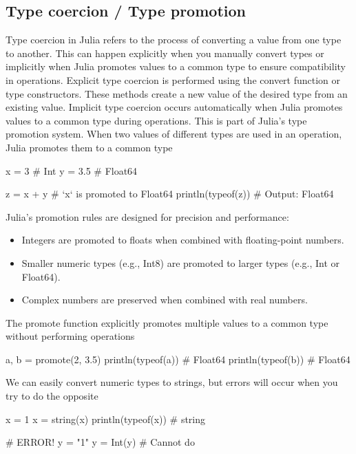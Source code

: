 \documentclass{report}
\begin{document}
    \subsection{Type coercion / Type promotion}
    \bigbreak \noindent 
    Type coercion in Julia refers to the process of converting a value from one type to another. This can happen explicitly when you manually convert types or implicitly when Julia promotes values to a common type to ensure compatibility in operations.
    \bigbreak \noindent 
    Explicit type coercion is performed using the convert function or type constructors. These methods create a new value of the desired type from an existing value.
    \bigbreak \noindent 
    Implicit type coercion occurs automatically when Julia promotes values to a common type during operations. This is part of Julia's type promotion system.
    \bigbreak \noindent 
    When two values of different types are used in an operation, Julia promotes them to a common type
    \bigbreak \noindent 
    \begin{jlcode}
        x = 3    # Int
        y = 3.5  # Float64

        z = x + y  # `x` is promoted to Float64
        println(typeof(z))  # Output: Float64
    \end{jlcode}
    \bigbreak \noindent 
    Julia's promotion rules are designed for precision and performance:
    \begin{itemize}
        \item Integers are promoted to floats when combined with floating-point numbers.
        \item Smaller numeric types (e.g., Int8) are promoted to larger types (e.g., Int or Float64).
        \item Complex numbers are preserved when combined with real numbers.
    \end{itemize}
    \bigbreak \noindent 
    The promote function explicitly promotes multiple values to a common type without performing operations
    \bigbreak \noindent 
    \begin{jlcode}
        a, b = promote(2, 3.5)
        println(typeof(a))  # Float64
        println(typeof(b))  # Float64
    \end{jlcode}
    \bigbreak \noindent 
    We can easily convert numeric types to strings, but errors will occur when you try to do the opposite
    \bigbreak \noindent 
    \begin{jlcode}
        x = 1
        x = string(x)
        println(typeof(x)) # string

        # ERROR!
        y = "1"
        y = Int(y) # Cannot do
    \end{jlcode}
\end{document}

